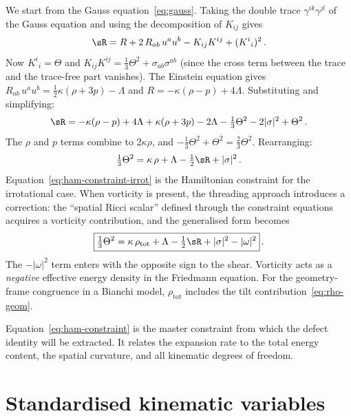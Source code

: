 We start from the Gauss equation~\eqref{eq:gauss}.  Taking the
double trace $\gamma^{ik}\gamma^{jl}$ of the Gauss equation and
using the decomposition of $K_{ij}$ gives
\begin{equation}\label{eq:gauss-trace}
\sR = R + 2\,R_{ab}\,u^a u^b
  - K_{ij}K^{ij} + (K^i{}_i)^2\,.
\end{equation}
Now $K^i{}_i = \Theta$ and
$K_{ij}K^{ij} = \frac{1}{3}\Theta^2 + \sigma_{ab}\sigma^{ab}$
(since the cross term between the trace and the trace-free
part vanishes).  The Einstein equation gives
$R_{ab}\,u^a u^b = \frac{1}{2}\kappa(\rho + 3p) - \Lambda$
and $R = -\kappa(\rho - p) + 4\Lambda$.  Substituting and
simplifying:
\begin{equation}
\sR = -\kappa(\rho - p) + 4\Lambda
  + \kappa(\rho + 3p) - 2\Lambda
  - \tfrac{1}{3}\Theta^2 - 2|\sigma|^2 + \Theta^2\,.
\end{equation}
The $\rho$ and $p$ terms combine to $2\kappa\rho$, and
$-\frac{1}{3}\Theta^2 + \Theta^2 = \frac{2}{3}\Theta^2$.
Rearranging:
\begin{equation}\label{eq:ham-constraint-irrot}
\tfrac{1}{3}\Theta^2
= \kappa\,\rho + \Lambda
  - \tfrac{1}{2}\sR
  + |\sigma|^2\,.
\end{equation}
Equation~\eqref{eq:ham-constraint-irrot} is the Hamiltonian constraint for the irrotational case.
When vorticity is present, the threading approach introduces a
correction: the ``spatial Ricci scalar'' defined through the
constraint equations acquires a vorticity contribution, and the
generalised form becomes~\cite{EllisVanElst1999,EllisMaartens2012}
\begin{equation}\label{eq:ham-constraint}
\boxed{
\tfrac{1}{3}\Theta^2
= \kappa\,\rho_{\mathrm{tot}} + \Lambda
  - \tfrac{1}{2}\sR
  + |\sigma|^2 - |\omega|^2
}\,.
\end{equation}
The $-|\omega|^2$ term enters with the opposite sign to the
shear.  Vorticity acts as a \emph{negative} effective energy
density in the Friedmann equation.  For the geometry-frame
congruence in a Bianchi model, $\rho_{\mathrm{tot}}$ includes
the tilt contribution~\eqref{eq:rho-geom}.

Equation~\eqref{eq:ham-constraint} is the master constraint
from which the defect identity will be extracted.  It relates
the expansion rate to the total energy content, the spatial
curvature, and all kinematic degrees of freedom.


\section{Standardised kinematic variables}\label{sec:std-vars}

